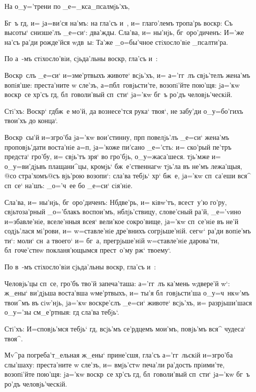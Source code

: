 На о_у='трени по _е=_кса_псалмjь'хъ,

Бг~ъ гд, и= jа=ви'ся на'мъ: на гла'съ и~, и= 
глаго'лемъ тропа'рь воскр: Съ высоты` снизше'лъ 
_е=си`: два'жды. Сла'ва, и= ны'нjь, бг~оро'диченъ: И='же 
на'съ ра'ди рожде'йся w\т дв~ы: Та'же _о=бы'чное 
стiхосло'вiе _псалти'ра.

По а~-мъ стiхосло'вiи, сjьда'льны воскр, гла'съ 
и~:

Воскр~слъ _е=си` и=з\ъ ме'ртвыхъ животе` всjь'хъ, и= 
а='гг~лъ свjь'телъ жена'мъ вопiя'ше: преста'ните w\т 
сле'зъ, а=п бл~говjьсти'те, возопi'йте пою'щя: 
jа='кw воскр~се хр'съ гд, бл~говоли'вый сп~сти` 
jа='кw бг~ъ ро'дъ человjь'ческiй.

Стi'хъ: Воскр` гд бж~е мо'й, да вознесе'тся 
рука` твоя`, не забу'ди о_у=бо'гихъ твои'хъ до конца`.

Воскр~сы'й и=з\ъ гро'ба jа='кw вои'стинну, прп 
повелjь'лъ _е=си` жена'мъ проповjь'дати воста'нiе 
а=п, jа='коже пи'сано _е='сть: и= ско'рый пе'тръ 
предста` гро'бу, и= свjь'тъ зря` во гро'бjь, 
о_у=жаса'шеся. тjь'мже и= о_у=ви'дjьвъ плащани^цы, 
кромjь` бж~е'ственнагw тjь'ла въ не'мъ лежа'щыя, @со 
стра'хомъ@{съ вjь'рою} возопи`: сла'ва тебjь` хр` 
бж~е, jа='кw сп~са'еши вся^ сп~се` на'шъ: _о='ч~ее бо 
_е=си` сiя'нiе.

Сла'ва, и= ны'нjь, бг~оро'диченъ: Нб две'рь, и= 
кiвw'тъ, всест~у'ю го'ру, свjьтоза'рный _о='блакъ 
воспои'мъ, нб лjь'ствицу, слове'сный ра'й, _е='vино 
и=збавле'нiе, вселе'нныя всея` вели'кое сокро'вище, 
jа='кw сп~се'нiе въ не'й содjь'лася мi'рови, и= 
w=ставле'нiе дре'внихъ согрjьше'нiй. сегw` ра'ди вопiе'мъ 
ти`: моли` сн~а твоего` и= бг~а, прегрjьше'нiй 
w=ставле'нiе дарова'ти, бл~гоче'стнw покланя'ющымся 
прест~о'му рж` твоему`.

По в~-мъ стiхосло'вiи сjьда'льны воскр, гла'съ и~:

Человjь'цы сп~се, гро'бъ тво'й запеча'таша: а='гг~лъ 
ка'мень w\т двере'й w`: ж_ены` ви'дjьша воста'вша 
w\т ме'ртвыхъ, и= ты'я бл~говjьсти'ша о_у=ч~нкw'мъ 
твои^мъ въ сiw'нjь, jа='кw воскре'слъ _е=си` животе` 
всjь'хъ, и= разрjьши'шася о_у='зы см_е'ртныя: гд 
сла'ва тебjь`.

Стi'хъ: И=сповjь'мся тебjь` гд, всjь'мъ се'рдцемъ 
мои'мъ, повjь'мъ вся^ чудеса` твоя^.

Мv^ра погреба'т_ельная ж_ены` прине'сшя, гла'съ 
а='гг~льскiй и=з\ъ гро'ба слы'шаху: преста'ните w\т 
сле'зъ, и= вмjь'стw печа'ли ра'дость прiими'те, 
возопi'йте пою'щя: jа='кw воскр~се хр'съ гд, 
бл~говоли'вый сп~сти` jа='кw бг~ъ ро'дъ человjь'ческiй.

